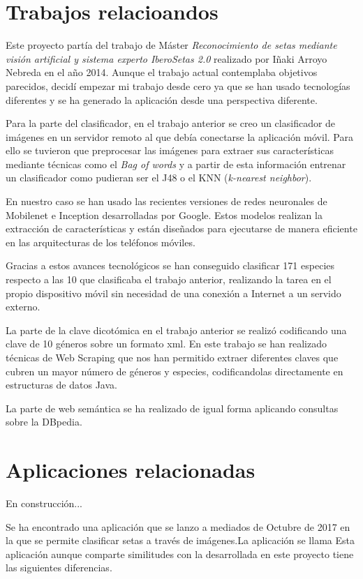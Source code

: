 

\section{Trabajos relacioandos}

Este proyecto partía del trabajo de Máster \textit{Reconocimiento de setas mediante visión artificial y sistema experto IberoSetas 2.0} realizado por Iñaki Arroyo Nebreda en el año 2014. Aunque el trabajo actual contemplaba objetivos parecidos, decidí empezar mi trabajo desde cero ya que se han usado tecnologías diferentes y se ha generado la aplicación desde una perspectiva diferente. \cite{iberosetas}

Para la parte del clasificador, en el trabajo anterior se creo un clasificador de imágenes en un servidor remoto al que debía conectarse la aplicación móvil. Para ello se tuvieron que preprocesar las imágenes para extraer sus características mediante técnicas como el \textit{Bag of words} y a partir de esta información entrenar un clasificador como pudieran ser el J48 o el KNN (\textit{k-nearest neighbor}).

En nuestro caso se han usado las recientes versiones de redes neuronales de Mobilenet e Inception desarrolladas por Google. Estos modelos realizan la extracción de características y están diseñados para ejecutarse de manera eficiente en las arquitecturas de los teléfonos móviles.

Gracias a estos avances tecnológicos se han conseguido clasificar 171 especies respecto a las 10 que clasificaba el trabajo anterior, realizando la tarea en el propio dispositivo móvil sin necesidad de una conexión a Internet a un servido externo.

La parte de la clave dicotómica en el trabajo anterior se realizó codificando una clave de 10 géneros sobre un formato xml. En este trabajo se han realizado técnicas de Web Scraping que nos han permitido extraer diferentes claves que cubren un mayor número de géneros y especies, codificandolas directamente en estructuras de datos Java.

La parte de web semántica se ha realizado de igual forma aplicando consultas sobre la DBpedia.

\section{Aplicaciones relacionadas}

En construcción...

Se ha encontrado una aplicación que se lanzo a mediados de Octubre de 2017 en la que se permite clasificar setas a través de imágenes.La aplicación se llama  Esta aplicación aunque comparte similitudes con la desarrollada en este proyecto tiene las siguientes diferencias.
